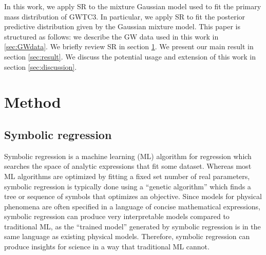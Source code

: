 \documentclass[nohyperref]{article}
\newcommand{\mc}[1]{{\color{purple}[MC: #1 ]}}
\theoremstyle{plain}
\theoremstyle{definition}
\theoremstyle{remark}
\begin{document}
In this work, we apply SR to the mixture Gaussian model used to fit the primary mass distribution of GWTC3.
In particular, we apply SR to fit the posterior predictive distribution given by the Gaussian mixture model.
This paper is structured as follows: we describe the GW data used in this work in \ref{sec:GWdata}.
We briefly review SR in section \ref{sec:method}.
We present our main result in section \ref{sec:result}.
We discuss the potential usage and extension of this work in section \ref{sec:discussion}.

\section{Method}
\label{sec:method}

\subsection{Symbolic regression}

Symbolic regression is a machine learning (ML) algorithm for regression which searches the space of analytic expressions that fit some dataset.
Whereas most ML algorithms are optimized by fitting a fixed set number of real parameters, symbolic regression is typically done using a ``genetic algorithm'' which finds a tree or sequence of symbols that optimizes an objective.
Since models for physical phenomena are often specified in a language of concise mathematical expressions, symbolic regression can produce very interpretable models compared to traditional ML, as the ``trained model'' generated by symbolic regression is in the same language as existing physical models.
Therefore, symbolic regression can produce insights for science in a way that traditional ML cannot.

\end{document}

